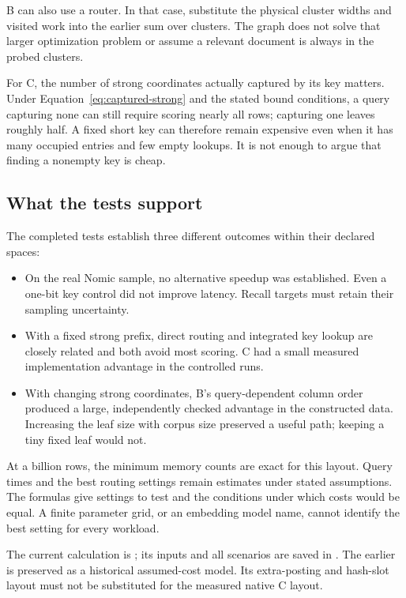 
B can also use a router. In that case, substitute the physical cluster widths and visited
work into the earlier sum over clusters. The graph does not solve that larger optimization
problem or assume a relevant document is always in the probed clusters.

For C, the number of strong coordinates actually captured by its key matters. Under
Equation~\eqref{eq:captured-strong} and the stated bound conditions, a query capturing none
can still require scoring nearly all rows; capturing one leaves roughly half. A fixed short
key can therefore remain expensive even when it has many occupied entries and few empty
lookups. It is not enough to argue that finding a nonempty key is cheap.

\subsection{What the tests support}
The completed tests establish three different outcomes within their declared spaces:
\begin{itemize}
\item On the real Nomic sample, no alternative speedup was established. Even a one-bit key
control did not improve latency. Recall targets must retain their sampling uncertainty.
\item With a fixed strong prefix, direct routing and integrated key lookup are closely related
and both avoid most scoring. C had a small measured implementation advantage in the controlled runs.
\item With changing strong coordinates, B's query-dependent column order produced a large,
independently checked advantage in the constructed data. Increasing the leaf size with corpus
size preserved a useful path; keeping a tiny fixed leaf would not.
\end{itemize}
At a billion rows, the minimum memory counts are exact for this layout. Query times and
the best routing settings remain estimates under stated assumptions. The formulas give
settings to test and the conditions under which costs would be equal. A finite parameter
grid, or an embedding model name, cannot identify the best setting for every workload.

The current calculation is ; its inputs and all scenarios
are saved in . The earlier
 is preserved as a historical assumed-cost
model. Its extra-posting and hash-slot layout must not be substituted for the measured native C layout.
